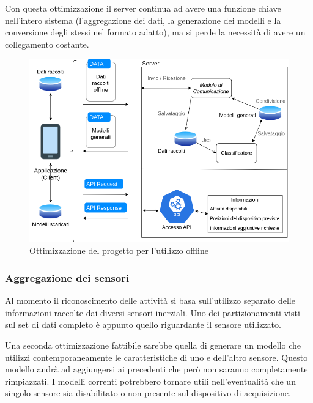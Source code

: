 \vspace{5mm} %
Con questa ottimizzazione il server continua ad avere una funzione chiave nell'intero sistema (l'aggregazione dei dati, la 
generazione dei modelli e la conversione degli stessi nel formato adatto), ma si perde la necessità di avere un collegamento costante.

\begin{figure}[H]
    \centering
    \includegraphics[scale = 0.56]{assets/images/future/offline.png}
    \caption{Ottimizzazione del progetto per l'utilizzo offline}
    \label{fig:future_overview}
\end{figure}

\subsubsection{Aggregazione dei sensori}
Al momento il riconoscimento delle attività si basa sull'utilizzo separato delle informazioni raccolte dai diversi sensori inerziali.
Uno dei partizionamenti visti sul set di dati completo è appunto quello riguardante il sensore utilizzato.

\vspace{5mm} %

Una seconda ottimizzazione fattibile sarebbe quella di generare un modello che utilizzi contemporaneamente le caratteristiche di uno e dell'altro sensore.
Questo modello andrà ad aggiungersi ai precedenti che però non saranno completamente rimpiazzati. I modelli correnti potrebbero 
tornare utili nell'eventualità che un singolo sensore sia disabilitato o non presente sul dispositivo di acquisizione.

